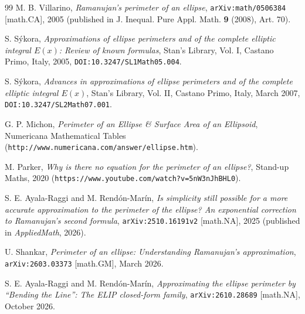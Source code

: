 \documentclass[11pt,a4paper]{article}
\theoremstyle{spacious}
\theoremstyle{spaciousdef}
\begin{document}
\begin{thebibliography}{99}
M. B. Villarino, \emph{Ramanujan's perimeter of an ellipse}, \texttt{arXiv:math/0506384} [math.CA], 2005 (published in J. Inequal. Pure Appl. Math. \textbf{9} (2008), Art. 70).

S. S\'ykora, \emph{Approximations of ellipse perimeters and of the complete elliptic integral $E(x)$: Review of known formulas}, Stan's Library, Vol. I, Castano Primo, Italy, 2005, \texttt{DOI:10.3247/SL1Math05.004}.

S. S\'ykora, \emph{Advances in approximations of ellipse perimeters and of the complete elliptic integral $E(x)$}, Stan's Library, Vol. II, Castano Primo, Italy, March 2007, \texttt{DOI:10.3247/SL2Math07.001}.

G. P. Michon, \emph{Perimeter of an Ellipse \& Surface Area of an Ellipsoid}, Numericana Mathematical Tables (\texttt{http://www.numericana.com/answer/ellipse.htm}).

M. Parker, \emph{Why is there no equation for the perimeter of an ellipse?}, Stand-up Maths, 2020 (\texttt{https://www.youtube.com/watch?v=5nW3nJhBHL0}).

S. E. Ayala-Raggi and M. Rend\'on-Mar\'in, \emph{Is simplicity still possible for a more accurate approximation to the perimeter of the ellipse? An exponential correction to Ramanujan's second formula}, \texttt{arXiv:2510.16191v2} [math.NA], 2025 (published in \emph{AppliedMath}, 2026).

U. Shankar, \emph{Perimeter of an ellipse: Understanding Ramanujan's approximation}, \texttt{arXiv:2603.03373} [math.GM], March 2026.

S. E. Ayala-Raggi and M. Rend\'on-Mar\'in, \emph{Approximating the ellipse perimeter by ``Bending the Line'': The ELIP closed-form family}, \texttt{arXiv:2610.28689} [math.NA], October 2026.

\end{thebibliography}
\end{document}
